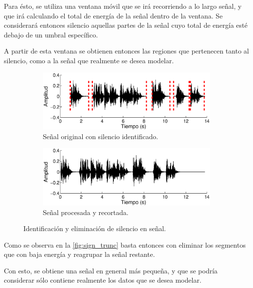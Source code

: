 Para ésto, se utiliza una ventana móvil que se irá recorriendo a lo largo señal, y que irá calculando el total de energía de la señal dentro de la ventana. Se considerará entonces silencio aquellas partes de la señal cuyo total de energía esté debajo de un umbral específico.

A partir de esta ventana se obtienen entonces las regiones que pertenecen tanto al silencio, como a la señal que realmente se desea modelar.
  
\begin{figure}[ht]
  \begin{subfigure}[b]{\textwidth}
    \includegraphics[width=0.9\linewidth]{gfx/chap2/signal1}
    \caption{Señal original con silencio identificado.}
    \label{fig:sign_silence}  
  \end{subfigure}

  \begin{subfigure}[b]{\textwidth}
    \includegraphics[width=0.9\linewidth]{gfx/chap2/signal2}
    \caption{Señal procesada y recortada.}
    \label{fig:sign_trunc}  
  \end{subfigure}
  
  \caption[Identificación/eliminación de silencios.]{Identificación y eliminación de silencio en señal.}  
  \label{fig:sign_ident}  
\end{figure}

Como se observa en la \autoref{fig:sign_trunc} basta entonces con eliminar los segmentos que con baja energía y reagrupar la señal restante.

Con esto, se obtiene una señal en general más pequeña, y que se podría  considerar sólo contiene realmente los datos que se desea modelar.

